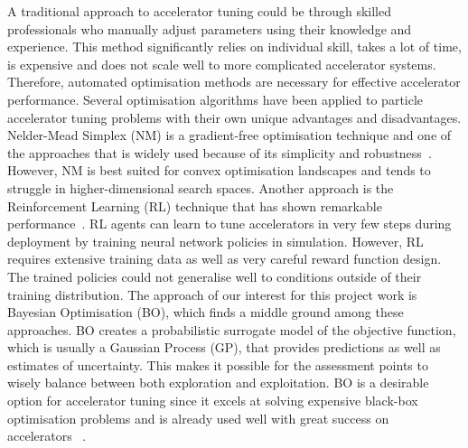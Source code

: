 A traditional approach to accelerator tuning could be through skilled professionals who manually adjust 
parameters using their knowledge and experience. This method significantly relies 
on individual skill, takes a lot of time, is expensive and does not scale well to more complicated accelerator 
systems. Therefore, automated optimisation methods are necessary for effective accelerator performance.
Several optimisation algorithms have been applied to particle accelerator tuning problems with their own unique 
advantages and disadvantages. Nelder-Mead Simplex (NM) is a gradient-free optimisation technique and one of the approaches 
that is widely used because of its simplicity and robustness~\cite{nelder1965simplex}. However, NM is best suited for convex 
optimisation landscapes and tends to struggle in higher-dimensional search spaces. Another approach is the Reinforcement Learning (RL) 
technique that has shown remarkable performance~\cite{kaiser2024rl}. RL agents can learn to tune accelerators in very few steps during deployment 
by training neural network policies in simulation. However, RL requires extensive training data as well as very careful reward 
function design. The trained policies could not generalise well to conditions outside of their training distribution. The approach 
of our interest for this project work is Bayesian Optimisation (BO), which finds a middle ground among these approaches. BO creates 
a probabilistic surrogate model of the objective function, which is usually a Gaussian Process (GP), that provides predictions 
as well as estimates of uncertainty. This makes it possible for the assessment points to wisely balance between both exploration and exploitation. BO is 
a desirable option for accelerator tuning since it excels at solving expensive black-box optimisation problems and is already used well with great 
success on accelerators~\cite{roussel2024bo,jalas2021bolaserplasma,Duris2020bofreelectron} . \

